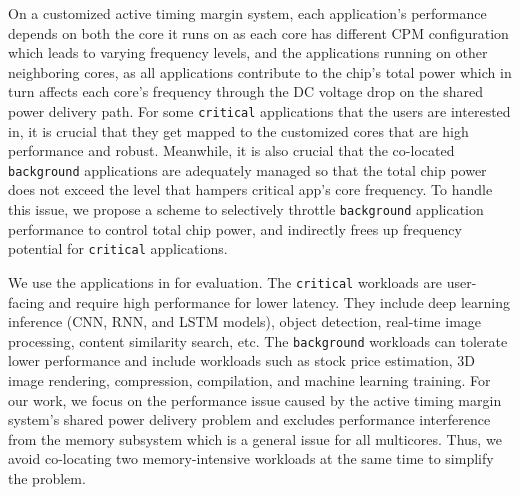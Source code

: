 On a customized active timing margin system, each application's performance depends on both the core it runs on as each core has different CPM configuration which leads to varying frequency levels, and the applications running on other neighboring cores, as all applications contribute to the chip's total power which in turn affects each core's frequency through the DC voltage drop on the shared power delivery path. For some \texttt{critical} applications that the users are interested in, it is crucial that they get mapped to the customized cores that are high performance and robust. Meanwhile, it is also crucial that the co-located \texttt{background} applications are adequately managed so that the total chip power does not exceed the level that hampers critical app's core frequency. To handle this issue, we propose a scheme to selectively throttle \texttt{background} application performance to control total chip power, and indirectly frees up frequency potential for \texttt{critical} applications.

\begin{table}[h!]
  \centering

  \caption{Classifying critical and background applications, based on their memory subsystem interference behavior.} 
  \vspace{-0.2cm}

  \label{tab:bench-type} 
\end{table}

We use the applications in  for evaluation. The \texttt{critical} workloads are user-facing and require high performance for lower latency. They include deep learning inference (CNN, RNN, and LSTM models), object detection, real-time image processing, content similarity search, etc. The \texttt{background} workloads can tolerate lower performance and include workloads such as stock price estimation, 3D image rendering, compression, compilation, and machine learning training. For our work, we focus on the performance issue caused by the active timing margin system's shared power delivery problem and excludes performance interference from the memory subsystem which is a general issue for all multicores. Thus, we avoid co-locating two memory-intensive workloads at the same time to simplify the problem.

